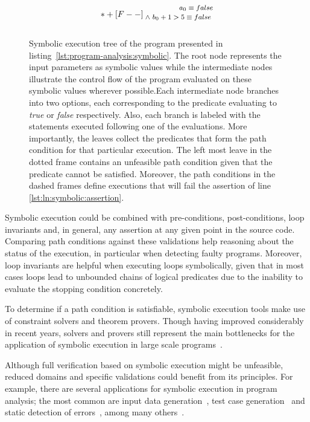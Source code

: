 \begin{figure}[t]
\[{	 *+[F--] \txt{\footnotesize $~~~~~~~~~~~~~~~a_{0} \equiv false$ 
	 \\ \footnotesize $\land ~ b_{0}+1 > 5 \equiv false$
 \\ ~}			
} \]
\caption{Symbolic execution tree of the program presented in listing~\ref{lst:program-analysis:symbolic}. The root node represents the input parameters as symbolic values while the intermediate nodes illustrate the control flow of the program evaluated on these symbolic values wherever possible.Each intermediate node branches into two options, each corresponding to the predicate evaluating to \textit{true} or \textit{false} respectively. Also, each branch is labeled with the statements executed following one of the evaluations. More importantly, the leaves collect the predicates that form the path condition for that particular execution. The left most leave in the dotted frame contains an unfeasible path condition given that the predicate cannot be satisfied. Moreover, the path conditions in the dashed frames define executions that will fail the assertion of line \ref{lst:ln:symbolic:assertion}.}
\label{fig:program-analysis:symbolic}
\end{figure}

Symbolic execution could be combined with pre-conditions, post-conditions, loop invariants and, in general, any assertion at any given point in the source code. Comparing path conditions against these validations help reasoning about the status of the execution, in particular when detecting faulty programs. Moreover, loop invariants are helpful when executing loops symbolically, given that in most cases loops lead to unbounded chains of logical predicates due to the inability to evaluate the stopping condition concretely.

To determine if a path condition is satisfiable, symbolic execution tools make use of constraint solvers and theorem provers. Though having improved considerably in recent years, solvers and provers still represent the main bottlenecks for the application of symbolic execution in large scale programs~\cite{Cadar2013}. 

Although full verification based on symbolic execution might be unfeasible, reduced domains and specific validations could benefit from its principles. For example, there are several applications for symbolic execution in program analysis; the most common are input data generation~\cite{Clarke1976}, test case generation~\cite{Cadar2008,Csallner,Godefroid2008,Visser2004a} and static detection of errors~\cite{Bush2000,Tomb2007}, among many others~\cite{Csallner2008,Siegel2006}.